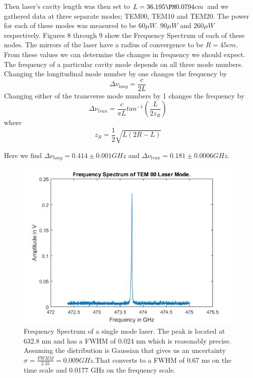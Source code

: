 \documentclass{article}
\begin{document}
Then laser's cavity length was then set to $L=36.195 \PM 0.0794 cm$ and we gathered data at three separate modes; TEM00, TEM10 and TEM20.   The power for each of these modes was measured to be $60 \mu W$. $90 \mu W$ and $260 \mu W$ respectively.  Figures 8 through 9 show the Frequency Spectrum of each of these nodes.  The mirrors of the laser have a radius of convergence to be $R=45cm$.  From these values we can determine the changes in frequency we should expect.  The frequency of a particular cavity mode depends on all three mode numbers.  Changing the longitudinal mode number by one changes the frequency by
\begin{equation}
\Delta\nu_{long}=\frac{c}{2L}
\end{equation}
Changing either of the transverse mode
numbers by 1 changes the frequency by
\begin{equation}
\Delta\nu_{tran}=\frac{c}{\pi L}tan^{-1}(\frac{L}{2z_{R}})
\end{equation}
where
\begin{equation}
 z_{R}=\frac{1}{2}\sqrt{L(2R-L)}   
\end{equation}

Here we find $\Delta\nu_{long}=0.414 \pm 0.001 GHz$ and $\Delta\nu_{tran}=0.181 \pm 0.0006 GHz$.



\begin{figure}[H]
\includegraphics[scale=0.4,center]{TEM00.jpg}
\caption{Frequency Spectrum of a single mode laser.  The peak is located at 632.8 nm and has a FWHM of 0.024 nm which is reasonably precise.  Assuming the distribution is Gaussian that gives us an uncertainty $\sigma=\frac{FWHM}{2.35}=0.009 GHz$.That converts to a FWHM of 0.67 ms on the time scale and 0.0177 GHz on the frequency scale.}
\end{figure}
\end{document}
